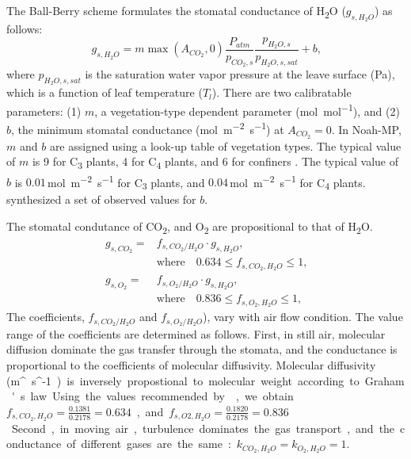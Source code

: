 \documentclass[essd]{copernicus}
\begin{document}
The Ball-Berry scheme \citep{ball1987PiPR, collatz1991AFM, collatz1992FPB}
formulates the stomatal conductance of H\textsubscript{2}O (\(g_{s,H_2O}\)) as
follows:
\begin{equation}
  g_{s,H_2O} = m \max(A_{CO_2},0) \frac{P_{atm}}{p_{CO_2,s}}\frac{p_{H_2O,s}}{p_{H_2O,s,sat}} + b \text{,}
\end{equation}
where \(p_{H_2O,s,sat}\) is the saturation water vapor pressure at the leave
surface (\si{Pa}), which is a function of leaf temperature (\(T_l\)). There are
two calibratable parameters: (1) \(m\), a vegetation-type dependent parameter
(\si{mol~mol^{-1}}), and (2) \(b\), the minimum stomatal conductance
(\si{mol~m^{-2}~s^{-1}}) at \(A_{CO_2} = 0\). In Noah-MP, \(m\) and \(b\) are
assigned using a look-up table of vegetation types. The typical value of \(m\)
is 9 for C\textsubscript{3} plants, 4 for C\textsubscript{4} plants, and 6 for
confiners \citep{sellers1996JC}. The typical value of \(b\) is
\(0.01\)\,\si{mol~m^{-2}~s^{-1}} for C\textsubscript{3} plants, and
\(0.04\)\,\si{mol~m^{-2}~s^{-1}} for C\textsubscript{4} plants.
\citet{Lombardozzi2017GMD} synthesized a set of observed values for \(b\).

The stomatal condutance of CO\textsubscript{2}, and O\textsubscript{2} are
propositional to that of H\textsubscript{2}O.
\begin{align}
  g_{s,CO_2} = & f_{s,CO_2/H_2O} \cdotp g_{s,H_2O} \text{,} \\
               & \text{where} \quad 0.634 \leq f_{s,CO_2,H_2O} \leq 1 \text{,} \nonumber \\
  g_{s,O_2} =  & f_{s,O_2/H_2O} \cdotp g_{s,H_2O} \text{,} \\
               & \text{where} \quad 0.836 \leq f_{s,O_2,H_2O} \leq 1 \text{,} \nonumber
\end{align}
The coefficients, \(f_{s,CO_2/H_2O}\) and \(f_{s,O_2/H_2O}\)), vary with air
flow condition. The value range of the coefficients are determined as follows.
First, in still air, molecular diffusion dominate the gas transfer through the
stomata, and the conductance is proportional to the coefficients of molecular
diffusivity. Molecular diffusivity (\si{m^~s^{-1}}) is inversely propostional to
molecular weight according to Graham's law. Using the values recommended by
\citet[Table 8]{massman1998AE}, we obtain \(f_{s,CO_2,H_2O} =
\frac{0.1381}{0.2178} = 0.634\), and \(f_{s,O2,H_2O} = \frac{0.1820}{0.2178} =
0.836\). Second, in moving air, turbulence dominates the gas transport, and the
conductance of different gases are the same: \(k_{CO_2,H_2O}=k_{O_2,H_2O}=1\).
\end{document}
